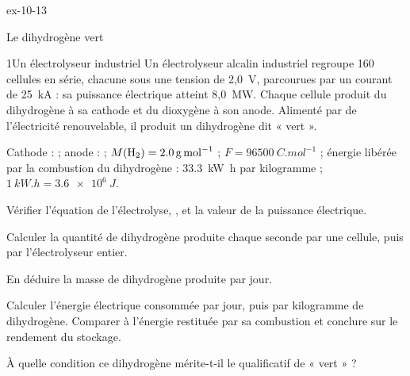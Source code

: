 \begin{blocLivre}{ex-10-13}
\begin{exercice}[3]{Le dihydrogène vert}
\begin{docu}{1}{Un électrolyseur industriel}
Un électrolyseur alcalin industriel regroupe 160 cellules en série, chacune sous une tension de 2,0~V, parcourues par
un courant de 25~kA : sa puissance électrique atteint 8,0~MW. Chaque cellule produit du dihydrogène à sa cathode et du
dioxygène à son anode. Alimenté par de l'électricité renouvelable, il produit un dihydrogène dit « vert ».
\end{docu}
\begin{donnees}
Cathode :  ; anode :  ;
$M(\ce{H2})=\qty{2,0}{g.mol^{-1}}$ ; $F=\qty{96500}{C.mol^{-1}}$ ; énergie libérée par la combustion du dihydrogène :
\qty{33,3}{kW.h} par kilogramme ; $\qty{1}{kW.h}=\qty{3,6e6}{J}$.
\end{donnees}
\begin{questions}
\item Vérifier l'équation de l'électrolyse, , et la valeur de la puissance électrique.
\item Calculer la quantité de dihydrogène produite chaque seconde par une cellule, puis par l'électrolyseur entier.
\item En déduire la masse de dihydrogène produite par jour.
\item \initiative Calculer l'énergie électrique consommée par jour, puis par kilogramme de dihydrogène. Comparer à
l'énergie restituée par sa combustion et conclure sur le rendement du stockage.
\item À quelle condition ce dihydrogène mérite-t-il le qualificatif de « vert » ?
\end{questions}
\end{exercice}
\end{blocLivre}
